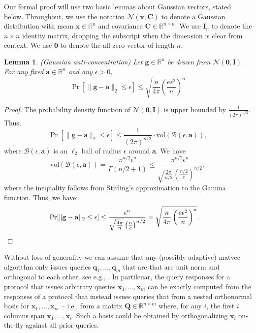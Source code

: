 \documentclass{article}[11pt]
\newtheorem{lemma}{Lemma}
\theoremstyle{definition}
\newcommand{\bv}[1]{\boldsymbol{\mathbf{#1}}}
\newcommand{\R}{\mathbb{R}}
\begin{document}
Our formal proof will use two basic lemmas about Gaussian vectors, stated below. Throughout, we use the notation $\mathcal{N}(\bv x, \bv C)$ to denote a Gaussian distribution with mean $\bv x \in \R^n$ and covariance $\bv C \in \R^{n \times n}$. We  use $\bv{I}_{n}$ to denote the $n \times n$ identity matrix, dropping the subscript when the dimension is clear from context. We use $\bv{0}$ to denote the all zero vector of length $n$.

\begin{lemma}{(Gaussian anti-concentration)}
\label{lem:other_anti_concentration}
Let $\bv{g} \in \R^{n}$ be drawn from $\mathcal{N}(\bv 0,\bv I)$. For any fixed $\bv a\in \mathbb{R}^n$ and any $\epsilon >0$,
    \[ \Pr[\|\bv{g}-\bv a\|_2 \leq \epsilon] \leq \sqrt{\frac{n}{4\pi}\left(\frac{e\epsilon^2}{n}\right)^{n}} \]
\end{lemma}
\begin{proof}
    The probability density function of $\mathcal{N}(\bv 0,\bv I)$ is upper bounded by $\frac{1}{(2\pi)^{n/2}}$. Thus, $$\Pr[\|\bv{g}-\bv a\|_2 \leq \epsilon] \le \frac{1}{(2\pi)^{n/2}} \cdot \mathrm{vol}(\mathcal B(\epsilon,\bv a)),$$ where $\mathcal B(\epsilon,\bv a)$ is an $\ell_2$ ball of radius $\epsilon$ around $\bv a$. We have 
    \[\mathrm{vol}(\mathcal B(\epsilon,\bv a)) = \frac{\pi^{n/2}\epsilon^n}{\Gamma(n/2+1)} \leq \frac{\pi^{n/2}\epsilon^n}{\sqrt{\frac{2\pi}{n/2}}\left(\frac{n/2}{e}\right)^{n/2}},\]
    where the inequality follows from Stirling's approximation to the Gamma function.
    Thus, we have:
    \begin{align*}
       \Pr[\|\bv{g}-\bv a\|_2 \leq \epsilon]
       &\leq \frac{\epsilon^n}{\sqrt{\frac{4\pi}{n}}\left(\frac{n}{e}\right)^{n/2}}
       = \sqrt{\frac{n}{4\pi}\left(\frac{e\epsilon^2}{n}\right)^{n}}. \qedhere
    \end{align*}
\end{proof}

Without loss of generality we can assume that any (possibly adaptive) matvec algorithm only issues queries $\bv{q}_1, \ldots, \bv{q}_m$ that are that are unit norm and orthogonal to each other; see e.g., \cite{SunWoodruffYang:2019}. In partilcuar, the query responses for a protocol that issues arbitrary queries $\bv{x}_1, \ldots, \bv{x}_m$ can be exactly computed from the responses of a protocol that instead issues queries that from a nested orthonormal basis for $\bv{x}_1, \ldots, \bv{x}_m$ -- i.e., from a matrix $\bv{Q}\in \R^{n\times m}$ where, for any $i$, the first $i$ columns span $\bv{x}_1, \ldots, \bv{x}_i$. Such a basis could be obtained by orthogonalizing $\bv{x}_i$ on-the-fly against all prior queries. 
\end{document}
